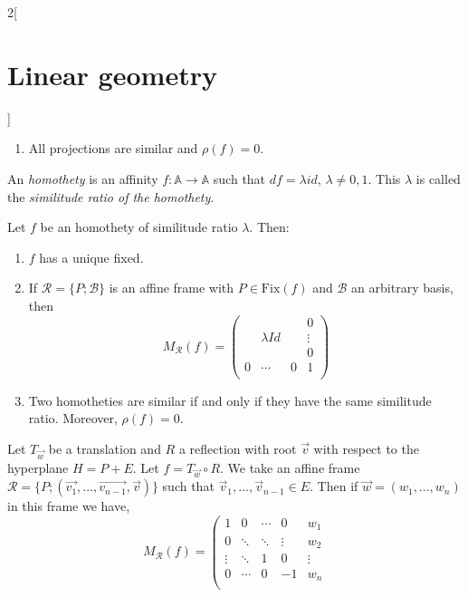 \documentclass[class=article,10pt,crop=false]{standalone}
\begin{document}
\begin{multicols}{2}[\section{Linear geometry}]
\begin{prop}
\begin{enumerate}
$$\begin{array}{cccc|c}
    \hline
    0 & \cdots & 0 & 0 &  1\\
    \end{array}\right)$$
    \item All projections are similar and $\rho(f)=0$.
\end{enumerate}
\end{prop}
\begin{definition}[Homotheties]
An \textit{homothety} is an affinity $f:\mathbb{A}\rightarrow\mathbb{A}$ such that $df=\lambda id$, $\lambda\ne0,1$. This $\lambda$ is called the \textit{similitude ratio of the homothety}.
\end{definition}
\begin{prop}
Let $f$ be an homothety of similitude ratio $\lambda$. Then:
\begin{enumerate}
    \item $f$ has a unique fixed.
    \item If $\mathcal{R}=\{P;\mathcal{B}\}$ is an affine frame with $P\in\text{Fix}(f)$ and $\mathcal{B}$ an arbitrary basis, then $$M_\mathcal{R}(f)=\left(\begin{array}{ccc|c}
     & & & 0\\
    & \lambda Id & & \vdots\\
    & & & 0\\
    \hline
    0 & \cdots & 0 &  1\\
    \end{array}\right)$$
    \item Two homotheties are similar if and only if they have the same similitude ratio. Moreover, $\rho(f)=0$.
\end{enumerate}
\end{prop}
\begin{prop}
Let $T_{\overrightarrow{w}}$ be a translation and $R$ a reflection with root $\overrightarrow{v}$ with respect to the hyperplane $H=P+E$. Let $f=T_{\overrightarrow{w}}\circ R$. We take an affine frame $\mathcal{R}=\{P;(\overrightarrow{v_1},\ldots,\overrightarrow{v_{n-1}},\overrightarrow{v})\}$ such that $\overrightarrow{v}_1,\ldots,\overrightarrow{v}_{n-1}\in E$. Then if $\overrightarrow{w}=(w_1,\ldots,w_n)$ in this frame we have,
    $$M_\mathcal{R}(f)=\left(\begin{array}{cccc|c}
    1 & 0 & \cdots & 0 & w_1\\
    0 & \ddots & \ddots & \vdots & w_2\\
    \vdots & \ddots & 1 & 0 & \vdots\\
    0 & \cdots & 0 & -1 & w_n\\

\end{array}$$
\end{prop}
\end{multicols}
\end{document}
